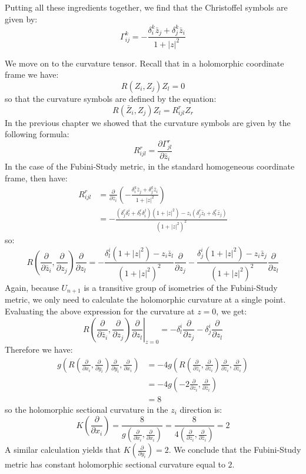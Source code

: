 \documentclass[11pt]{amsart}
\theoremstyle{definition}
\def \del{ \partial }
\begin{document}
%
Putting all these ingredients together, we find that the Christoffel symbols are given by:
%
$$ \Gamma^k_{ij} = - \frac{ \delta^k_i \bar{z}_j + \delta^k_j \bar{z}_i }{ 1 + |z|^2 } $$


We move on to the curvature tensor.  Recall that in a holomorphic coordinate frame we have:
%
$$ R(Z_i, Z_j)Z_l = 0$$
%
so that the curvature symbols are defined by the equation:
%
$$ R( \bar{Z}_i, Z_j )Z_l = R_{ijl}^r Z_r $$
%
In the previous chapter we showed that the curvature symbols are given by the following formula:
%
$$ R_{ijl}^r = \frac{ \del \Gamma_{jl}^r }{ \del \bar{z}_i } $$
%
In the case of the Fubini-Study metric, in the standard homogeneous coordinate frame, then have:
%
\begin{align*}
R_{ijl}^r &= \frac{\del}{\del \bar{z}_i } \left( - \frac{ \delta^k_i \bar{z}_j + \delta^k_j \bar{z}_i }{ 1 + |z|^2 } \right) \\
&= - \frac{ (\delta^r_j \delta^i_l + \delta^r_l \delta^j_i)( 1 + |z|^2 ) - z_i ( \delta^r_j \bar{z}_l + \delta^r_l \bar{z}_j ) }{ (1 + |z|^2)^2 } 
\end{align*}
%
so:
%
$$ R \left( \frac{ \del }{ \del \bar{z}_i }, \frac{ \del }{ \del z_j } \right) \frac{ \del }{ \del z_l } = - \frac{ \delta^i_l (1 + |z|^2) - z_i \bar{z}_l }{ (1 + |z|^2)^2 } \frac{ \del }{ \del z_j } - \frac{ \delta^i_j (1 + |z|^2) - z_i \bar{z}_j }{ (1 + |z|^2)^2 } \frac{ \del }{ \del z_l } $$
%
Again, because $U_{n+1}$ is a transitive group of isometries of the Fubini-Study metric, we only need to calculate the holomorphic curvature at a single point.  Evaluating the above expression for the curvature at $z=0$, we get:
%
$$ R \left. \left( \frac{ \del }{ \del \bar{z}_i }, \frac{ \del }{ \del z_j } \right) \frac{ \del }{ \del z_l } \right|_{z=0} = - \delta^i_l \frac{ \del }{ \del z_j } - \delta^i_j \frac{ \del }{ \del z_l }$$
%
Therefore we have:
%
\begin{align*} g \left( R \left( \frac{ \del }{ \del x_i }, \frac{ \del }{ \del y_i } \right) \frac{ \del }{ \del y_i }, \frac{ \del }{ \del x_i } \right) &= - 4 g \left( R \left( \frac{ \del }{ \del \bar{z}_i }, \frac{ \del }{ \del z_i } \right) \frac{ \del }{ \del z_i }, \frac{ \del }{ \del \bar{z}_i } \right) \\
&= -4 g \left( - 2 \frac{ \del }{ \del z_i}, \frac{ \del }{ \del \bar{z}_i } \right) \\
&= 8 
\end{align*}
%
so the holomorphic sectional curvature in the $z_i$ direction is:
%
$$ K \left( \frac{ \del }{ \del x_i } \right) = \frac{8}{ g \left( \frac{ \del }{ \del x_i }, \frac{ \del }{ \del x_i } \right) } = \frac{8}{4 \left( \frac{ \del }{ \del z_i }, \frac{ \del }{ \del \bar{z}_i } \right) } = 2 $$
%
A similar calculation yields that $K \left( \frac{ \del }{ \del y_i } \right) = 2$.  We conclude that the Fubini-Study metric has constant holomorphic sectional curvature equal to $2$.
%
\end{document}
